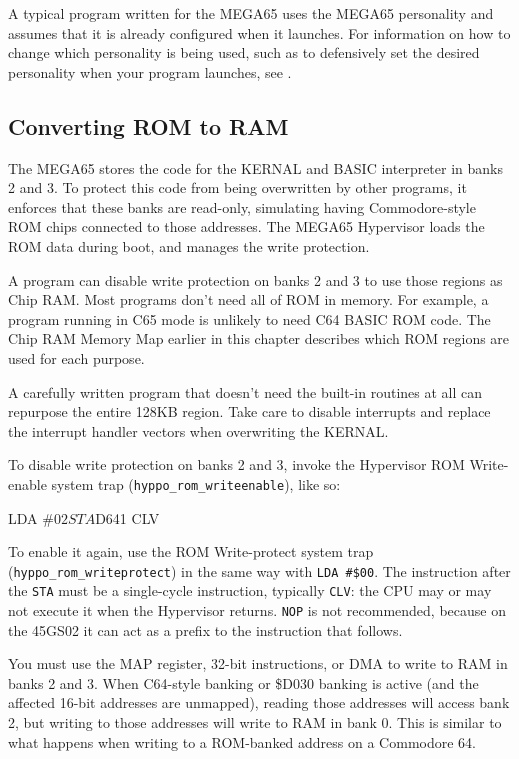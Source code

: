 A typical program written for the MEGA65 uses the MEGA65 personality and assumes that it is already configured when it launches. For information on how to change which personality is being used, such as to defensively set the desired personality when your program launches, see .

\subsection{Converting ROM to RAM}

The MEGA65 stores the code for the KERNAL and BASIC interpreter in banks 2 and 3. To protect this code from being overwritten by other programs, it enforces that these banks are read-only, simulating having Commodore-style ROM chips connected to those addresses. The MEGA65 Hypervisor loads the ROM data during boot, and manages the write protection.

A program can disable write protection on banks 2 and 3 to use those regions as Chip RAM. Most programs don't need all of ROM in memory. For example, a program running in C65 mode is unlikely to need C64 BASIC ROM code. The Chip RAM Memory Map earlier in this chapter describes which ROM regions are used for each purpose.

A carefully written program that doesn't need the built-in routines at all can repurpose the entire 128KB region. Take care to disable interrupts and replace the interrupt handler vectors when overwriting the KERNAL.

To disable write protection on banks 2 and 3, invoke the Hypervisor ROM Write-enable system trap ({\tt hyppo\_rom\_writeenable}), like so:

\begin{asmcode}
LDA #$02
STA $D641
CLV
\end{asmcode}

To enable it again, use the ROM Write-protect system trap ({\tt hyppo\_rom\_writeprotect}) in the same way with {\tt LDA \#\$00}. The instruction after the {\tt STA} must be a single-cycle instruction, typically {\tt CLV}: the CPU may or may not execute it when the Hypervisor returns. {\tt NOP} is not recommended, because on the 45GS02 it can act as a prefix to the instruction that follows.

You must use the MAP register, 32-bit instructions, or DMA to write to RAM in banks 2 and 3. When C64-style banking or \$D030 banking is active (and the affected 16-bit addresses are unmapped), reading those addresses will access bank 2, but writing to those addresses will write to RAM in bank 0. This is similar to what happens when writing to a ROM-banked address on a Commodore 64.

